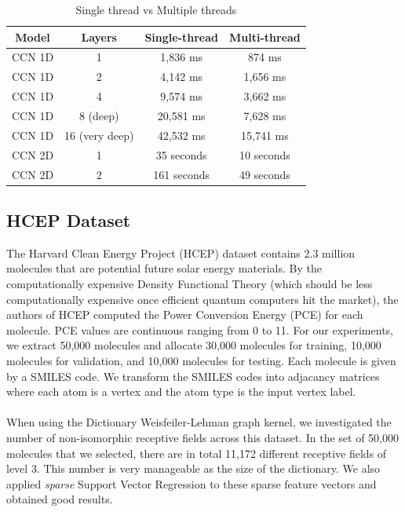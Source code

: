 \documentclass[a4paper]{article}
\begin{document}
\begin{table}[h]
\caption{Single thread vs Multiple threads}\label{tab:basic_molecules}
\begin{tabular}{|| c | c | c | c ||}	
	\hline
	Model & Layers & Single-thread & Multi-thread \\
	\hline\hline
	CCN 1D & 1 & 1,836 ms & 874 ms \\
	\hline
	CCN 1D & 2 & 4,142 ms & 1,656 ms\\
	\hline
	CCN 1D & 4 & 9,574 ms & 3,662 ms \\
	\hline
	CCN 1D & 8 (deep) & 20,581 ms & 7,628 ms \\
	\hline
	CCN 1D & 16 (very deep) & 42,532 ms & 15,741 ms\\
	\hline
	CCN 2D & 1 & 35 seconds & 10 seconds \\
	\hline
	CCN 2D & 2 & 161 seconds & 49 seconds \\
	\hline
\end{tabular}
\end{table}

\subsection{HCEP Dataset}

The Harvard Clean Energy Project (HCEP) dataset \cite{Johannes} contains 2.3 million molecules that are potential future solar energy materials. By the computationally expensive Density Functional Theory (which should be less computationally expensive once efficient quantum computers hit the market), the authors of HCEP computed the Power Conversion Energy (PCE) for each molecule. PCE values are continuous ranging from 0 to 11. For our experiments, we extract 50,000 molecules and allocate 30,000 molecules for training, 10,000 molecules for validation, and 10,000 molecules for testing. Each molecule is given by a SMILES code. We transform the SMILES codes into adjacancy matrices where each atom is a vertex and the atom type is the input vertex label. \\ \\
When using the Dictionary Weisfeiler-Lehman graph kernel, we investigated the number of non-isomorphic receptive fields across this dataset. In the set of 50,000 molecules that we selected, there are in total 11,172 different receptive fields of level 3. This number is very manageable as the size of the dictionary. We also applied \textit{sparse} Support Vector Regression to these sparse feature vectors and obtained good results.
\end{document}

